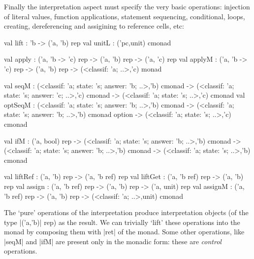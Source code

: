 \documentclass{elsart}
\begin{document}
Finally the interpretation aspect must specify the very basic
operations: injection of literal values, function
applications, statement sequencing, conditional, loops, creating,
dereferencing and assigining to reference cells, etc:
\begin{code}
val lift  : 'b -> ('a, 'b) rep
val unitL : ('pc,unit) cmonad

val apply  : ('a, 'b -> 'c) rep -> ('a, 'b) rep -> ('a, 'c) rep
val applyM : ('a, 'b -> 'c) rep -> ('a, 'b) rep -> 
             (<classif: 'a; ..>,'c) monad

val seqM :
   (<classif: 'a; state: 's; answer: 'b; ..>,'b) cmonad ->
   (<classif: 'a; state: 's; answer: 'c; ..>,'c) cmonad ->
   (<classif: 'a; state: 's; ..>,'c) cmonad
val optSeqM : 
   (<classif: 'a; state: 's; answer: 'b; ..>,'b) cmonad ->
   (<classif: 'a; state: 's; answer: 'b; ..>,'b) cmonad option ->
   (<classif: 'a; state: 's; ..>,'c) cmonad

val ifM : ('a, bool) rep ->
   (<classif: 'a; state: 's; answer: 'b; ..>,'b) cmonad ->
   (<classif: 'a; state: 's; answer: 'b; ..>,'b) cmonad ->
   (<classif: 'a; state: 's; ..>,'b) cmonad

val liftRef : ('a, 'b) rep -> ('a, 'b ref) rep
val liftGet : ('a, 'b ref) rep -> ('a, 'b) rep
val assign  : ('a, 'b ref) rep -> ('a, 'b) rep -> ('a, unit) rep
val assignM : ('a, 'b ref) rep -> ('a, 'b) rep -> 
              (<classif: 'a; ..>,unit) cmonad
\end{code}

The `pure' operations of the interpretation produce interpretation
objects (of the type |('a,'b)| rep) as the result. We can trivially
`lift' these operations into the monad by composing them with |ret| of
the monad. Some other operations, like |seqM| and |ifM| are present
only in the monadic form: these are \emph{control} operations.
\end{document}
